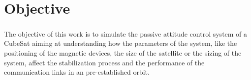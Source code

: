 %
%
%
%
%

%
%
%
%
%
%

\chapter{Objective} \label{ch:objective}

\paragraph{}
\indent 
    The objective of this work is to simulate the passive attitude control system of a CubeSat aiming at understanding how the parameters of the system, like the positioning of the magnetic devices, the size of the satellite or the sizing of the system, affect the stabilization process and the performance of the communication links in an pre-established orbit.

